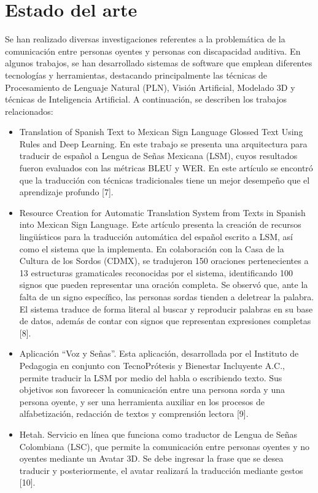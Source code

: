 \section{Estado del arte}
Se han realizado diversas investigaciones referentes a la problemática de la comunicación entre personas oyentes y personas con discapacidad auditiva. En algunos trabajos, se han desarrollado sistemas de software que emplean diferentes tecnologías y herramientas, destacando principalmente las técnicas de Procesamiento de Lenguaje Natural (PLN), Visión Artificial, Modelado 3D y técnicas de Inteligencia Artificial. A continuación, se describen los trabajos relacionados: \begin{itemize}
    \item Translation of Spanish Text to Mexican Sign Language Glossed Text Using Rules and Deep Learning. En este trabajo se presenta una arquitectura para traducir de español a Lengua de Señas Mexicana (LSM), cuyos resultados fueron evaluados con las métricas BLEU y WER. En este artículo se encontró que la traducción con técnicas tradicionales tiene un mejor desempeño que el aprendizaje profundo [7].
\item Resource Creation for Automatic Translation System from Texts in Spanish into Mexican Sign Language. Este artículo presenta la creación de recursos lingüísticos para la traducción automática del español escrito a LSM, así como el sistema que la implementa. En colaboración con la Casa de la Cultura de los Sordos (CDMX), se tradujeron 150 oraciones pertenecientes a 13 estructuras gramaticales reconocidas por el sistema, identificando 100 signos que pueden representar una oración completa. Se observó que, ante la falta de un signo específico, las personas sordas tienden a deletrear la palabra. El sistema traduce de forma literal al buscar y reproducir palabras en su base de datos, además de contar con signos que representan expresiones completas [8].
\item Aplicación “Voz y Señas”. Esta aplicación, desarrollada por el Instituto de Pedagogia en conjunto con TecnoPrótesis y Bienestar Incluyente A.C., permite traducir la LSM por medio del habla o escribiendo texto. Sus objetivos son favorecer la comunicación entre una persona sorda y una persona oyente, y ser una herramienta auxiliar en los procesos de alfabetización, redacción de textos y comprensión lectora [9]. 
\item Hetah. Servicio en línea que funciona como traductor de Lengua de Señas Colombiana (LSC), que permite la comunicación entre personas oyentes y no oyentes mediante un Avatar 3D. Se debe ingresar la frase que se desea traducir y posteriormente, el avatar realizará la traducción mediante gestos [10]. 

\end{itemize}
